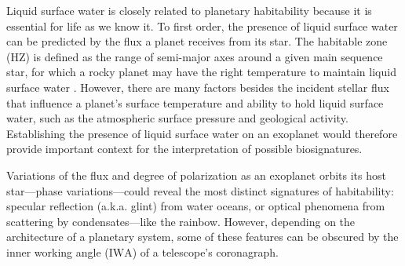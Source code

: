 \documentclass[usenatbib]{mnras}
\newcommand{\IWA}{\ensuremath{\mathrm{IWA}}\xspace}
\begin{document}
Liquid surface water is closely related to planetary habitability because it is essential for life as we know it.
%
To first order, the presence of liquid surface water can be predicted by the flux a planet receives from its star.
%
The habitable zone (HZ) is defined as the range of semi-major axes around a given main sequence star, for which a rocky planet may have the right temperature to maintain liquid surface water \citep{kasting93}. 
%
However, there are many factors besides the incident stellar flux that influence a planet's surface temperature and ability to hold liquid surface water, such as the atmospheric surface pressure and geological activity. 
%
Establishing the presence of liquid surface water on an exoplanet would therefore provide important context for the interpretation of possible biosignatures.

Variations of the flux and degree of polarization as an exoplanet orbits its host star---phase variations---could reveal the most distinct signatures of habitability: 
specular reflection (a.k.a. glint) from water oceans, or optical phenomena from scattering by condensates---like the rainbow.
%
However, depending on the architecture of a planetary system, some of these features can be obscured by the inner working angle (\IWA) of a telescope's coronagraph.
%





%

%
\end{document}
